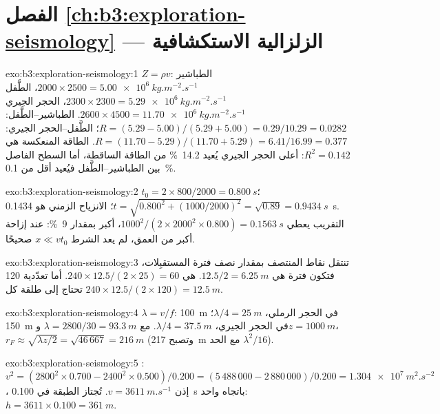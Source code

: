 \section*{الفصل \ref{ch:b3:exploration-seismology} --- الزلزالية الاستكشافية}

\begin{solution}{exo:b3:exploration-seismology:1}
$Z = \rho v$: الطباشير $2000\times2500 = \qty{5.00e6}{kg.m^{-2}.s^{-1}}$، الطَّفل
$2300\times2300 = \qty{5.29e6}{kg.m^{-2}.s^{-1}}$، الحجر الجيري $2600\times4500 =
\qty{11.70e6}{kg.m^{-2}.s^{-1}}$. الطباشير--الطَّفل: $R = (5.29 - 5.00)/(5.29 + 5.00)
= 0.29/10.29 = 0.0282$؛ الطَّفل--الحجر الجيري: $R = (11.70 - 5.29)/(11.70 + 5.29) =
6.41/16.99 = 0.377$. الطاقة المنعكسة هي $R^2 = 0.142$: أعلى
الحجر الجيري يُعيد \qty{14.2}{\percent} من الطاقة الساقطة، أما السطح الفاصل بين الطباشير--الطَّفل
فيُعيد أقل من \qty{0.1}{\percent}.
\end{solution}

\begin{solution}{exo:b3:exploration-seismology:2}
$t_0 = 2\times800/2000 = \qty{0.800}{s}$؛ $t = \sqrt{0.800^2 + (1000/2000)^2} =
\sqrt{0.89} = \qty{0.9434}{s}$؛ الانزياح الزمني هو \qty{0.1434}{s}. التقريب
يعطي $1000^2/(2\times2000^2\times0.800) = \qty{0.1563}{s}$، أكبر
بمقدار \qty{9}{\percent}: عند إزاحة أكبر من العمق، لم
يعد الشرط $x \ll vt_0$ صحيحًا.
\end{solution}

\begin{solution}{exo:b3:exploration-seismology:3}
تنتقل نقاط المنتصف بمقدار نصف فترة المستقبِلات، فتكون فترة 
هي $12.5/2 = \qty{6.25}{m}$.  هي $240\times12.5/(2\times25) = 60$. أما تعدّدية
120 تحتاج إلى طلقة كل $240\times12.5/(2\times120) = \qty{12.5}{m}$.
\end{solution}

\begin{solution}{exo:b3:exploration-seismology:4}
$\lambda = v/f$: \qty{100}{m} في الحجر الرملي، $\lambda/4 = \qty{25}{m}$؛
\qty{150}{m} في الحجر الجيري، $\lambda/4 = \qty{37.5}{m}$. مع
$\lambda = 2800/30 = \qty{93.3}{m}$ و$z = \qty{1000}{m}$،
$r_F \approx \sqrt{\lambda z/2} = \sqrt{46\,667} = \qty{216}{m}$ (وتصبح \qty{217}{m}
مع الحد $\lambda^2/16$).
\end{solution}

\begin{solution}{exo:b3:exploration-seismology:5}
: $v^2 = (2800^2\times0.700 - 2400^2\times0.500)/0.200 = (5\,488\,000 -
2\,880\,000)/0.200 = \qty{1.304e7}{m^2.s^{-2}}$، إذن $v = \qty{3611}{m.s^{-1}}$.
تُجتاز الطبقة في \qty{0.100}{s} باتجاه واحد: $h = 3611\times0.100 =
\qty{361}{m}$.
\end{solution}

